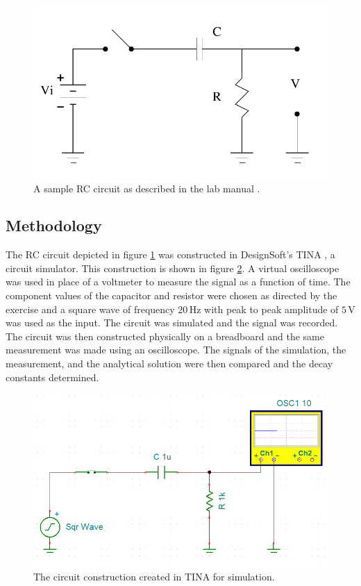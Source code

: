 \documentclass[%
reprint,
amsmath,amssymb,
aps,
floatfix
]{revtex4-2}
\begin{document}
		\begin{figure}
			\includegraphics[width=0.85\columnwidth]{sampleRC.png}
			\caption{\label{fig:sampleRC}A sample RC circuit as described in the lab manual \cite{manual}.}
		\end{figure}
	
		\subsection{Methodology}
		The RC circuit depicted in figure \ref{fig:sampleRC} was constructed in DesignSoft's TINA \cite{TINA}, a circuit simulator. This construction is shown in figure \ref{fig:ex5Circuit}. A virtual oscilloscope was used in place of a voltmeter to measure the signal as a function of time. The component values of the capacitor and resistor were chosen as directed by the exercise and a square wave of frequency $20 \,\text{Hz}$ with peak to peak amplitude of $5\,\text{V}$ was used as the input. The circuit was simulated and the signal was recorded. The circuit was then constructed physically on a breadboard and the same measurement was made using an oscilloscope. The signals of the simulation, the measurement, and the analytical solution were then compared and the decay constants determined.
		
		\begin{figure}
			\includegraphics[width=0.85\columnwidth]{circuit_ex5.png}
			\caption{\label{fig:ex5Circuit}The circuit construction created in TINA for simulation.}
		\end{figure}
		
\end{document}
